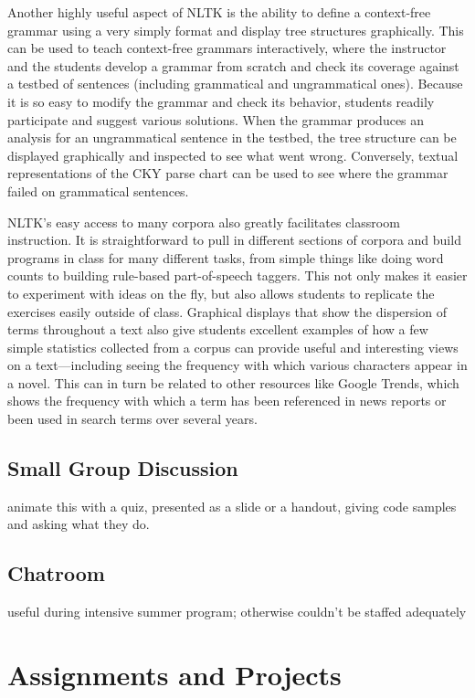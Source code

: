 \documentclass[11pt]{article}
\begin{document}
Another highly useful aspect of NLTK is the ability to define a
context-free grammar using a very simply format and display tree
structures graphically. This can be used to teach context-free
grammars interactively, where the instructor and the students develop
a grammar from scratch and check its coverage against a testbed of
sentences (including grammatical and ungrammatical ones). Because it
is so easy to modify the grammar and check its behavior, students
readily participate and suggest various solutions. When the grammar
produces an analysis for an ungrammatical sentence in the testbed, the
tree structure can be displayed graphically and inspected to see what
went wrong. Conversely, textual representations of the CKY parse chart
can be used to see where the grammar failed on grammatical sentences.

NLTK's easy access to many corpora also greatly facilitates classroom
instruction. It is straightforward to pull in different sections of
corpora and build programs in class for many different tasks, from
simple things like doing word counts to building rule-based
part-of-speech taggers. This not only makes it easier to experiment
with ideas on the fly, but also allows students to replicate the
exercises easily outside of class. Graphical displays that show the
dispersion of terms throughout a text also give students excellent
examples of how a few simple statistics collected from a corpus can
provide useful and interesting views on a text---including seeing the
frequency with which various characters appear in a novel. This can in
turn be related to other resources like Google Trends, which shows the
frequency with which a term has been referenced in news reports or
been used in search terms over several years.


\subsection{Small Group Discussion}

animate this with a quiz, presented as a slide or a handout, giving code samples and asking what they do.

\subsection{Chatroom}

useful during intensive summer program; otherwise couldn't be staffed adequately

\section{Assignments and Projects}
\label{sec:projects}
\end{document}
